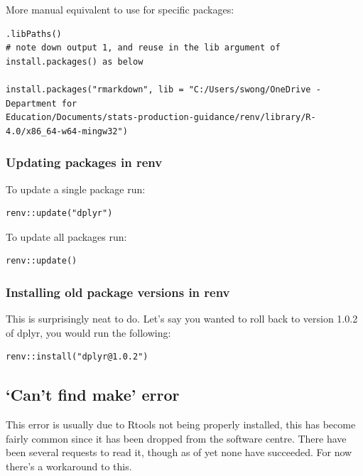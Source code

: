 \documentclass[
  12pt,
]{article}
\begin{document}
More manual equivalent to use for specific packages:

\begin{verbatim}
.libPaths() 
# note down output 1, and reuse in the lib argument of install.packages() as below

install.packages("rmarkdown", lib = "C:/Users/swong/OneDrive - Department for
Education/Documents/stats-production-guidance/renv/library/R-4.0/x86_64-w64-mingw32")
\end{verbatim}

\hypertarget{updating-packages-in-renv}{%
\subsubsection{Updating packages in
renv}\label{updating-packages-in-renv}}

To update a single package run:

\begin{verbatim}
renv::update("dplyr")
\end{verbatim}

To update all packages run:

\begin{verbatim}
renv::update()
\end{verbatim}

\hypertarget{installing-old-package-versions-in-renv}{%
\subsubsection{Installing old package versions in
renv}\label{installing-old-package-versions-in-renv}}

This is surprisingly neat to do. Let's say you wanted to roll back to
version 1.0.2 of dplyr, you would run the following:

\begin{verbatim}
renv::install("dplyr@1.0.2")
\end{verbatim}

\hypertarget{cant-find-make-error}{%
\subsection{`Can't find make' error}\label{cant-find-make-error}}

This error is usually due to Rtools not being properly installed, this
has become fairly common since it has been dropped from the software
centre. There have been several requests to read it, though as of yet
none have succeeded. For now there's a workaround to this.
\end{document}
